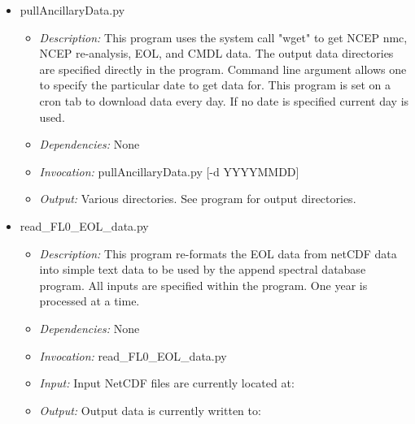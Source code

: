 \documentclass[12pt, letterpaper]{article}
\begin{document}
\begin{itemize}
\item pullAncillaryData.py
\begin{itemize}
\item \textit{Description:} This program uses the system call "wget" to get NCEP nmc, NCEP re-analysis, EOL, and CMDL data. The output data directories are specified directly in the program. Command line argument allows one to specify the particular date to get data for. This program is set on a cron tab to download data every day. If no date is specified current day is used.
\item \textit{Dependencies:} None
\item \textit{Invocation:} pullAncillaryData.py [-d YYYYMMDD]
\item \textit{Output:} Various directories. See program for output directories.
\end{itemize}
\end{itemize}

\begin{itemize}
\item read\_FL0\_EOL\_data.py
\begin{itemize}
\item \textit{Description:} This program re-formats the EOL data from netCDF data into simple text data to be used by the append spectral database program. All inputs are specified within the program. One year is processed at a time.
\item \textit{Dependencies:} None
\item \textit{Invocation:} read\_FL0\_EOL\_data.py
\item \textit{Input:} Input NetCDF files are currently located at: 
\item \textit{Output:} Output data is currently written to: 
\end{itemize}
\end{itemize}
\end{document}
